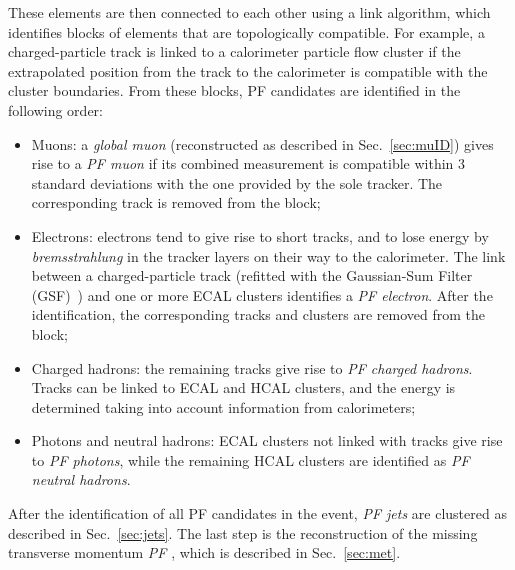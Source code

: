 These elements are then connected to each other using a link algorithm, which identifies blocks of elements that are topologically compatible. For example, a charged-particle track is linked to a calorimeter particle flow cluster if the extrapolated position from the track to the calorimeter is compatible with the cluster boundaries. From these blocks, PF candidates are identified in the following order:
\begin{itemize}
\item Muons: a \emph{global muon} (reconstructed as described in Sec.~\ref{sec:muID}) gives rise to a \emph{PF muon} if its combined \pt measurement is compatible within 3 standard deviations with the one provided by the sole tracker. The corresponding track is removed from the block;
\item Electrons: electrons tend to give rise to short tracks, and to lose energy by \emph{bremsstrahlung} in the tracker layers on their way to the calorimeter. The link between a charged-particle track (refitted with the Gaussian-Sum Filter (GSF)~\cite{Adam:815410}) and one or more ECAL clusters identifies a \emph{PF electron}. After the identification, the corresponding tracks and clusters are removed from the block;
\item Charged hadrons: the remaining tracks give rise to \emph{PF charged hadrons}. Tracks can be linked to ECAL and HCAL clusters, and the energy is determined taking into account information from calorimeters;
\item Photons and neutral hadrons: ECAL clusters not linked with tracks give rise to \emph{PF photons}, while the remaining HCAL clusters are identified as \emph{PF neutral hadrons}.
\end{itemize}
After the identification of all PF candidates in the event, \emph{PF jets} are clustered as described in Sec.~\ref{sec:jets}. The last step is the reconstruction of the missing transverse momentum \emph{PF \ptmiss}, which is described in Sec.~\ref{sec:met}.
